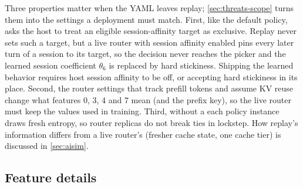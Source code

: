 Three properties matter when the YAML leaves replay; \cref{sec:threats-scope} turns them into the
settings a deployment must match. First, like the default policy, \lc{} asks
the host to treat an eligible session-affinity target as exclusive. Replay never sets such a
target, but a live router with session affinity enabled pins every later turn of a session to
its target, so the decision never reaches the picker and the learned session coefficient
$\theta_6$ is replaced by hard stickiness. Shipping the learned behavior requires host session
affinity to be off, or accepting hard stickiness in its place. Second, the router settings that
track prefill tokens and assume KV reuse change what features 0, 3, 4 and 7 mean (and the
 prefix key), so the live router must keep the values used in training. Third, without a
 each policy instance draws fresh entropy, so router replicas do not break ties in
lockstep. How replay's information differs from a live router's (fresher cache state, one cache
tier) is discussed in \cref{sec:aisim}.

\subsection{Feature details}

